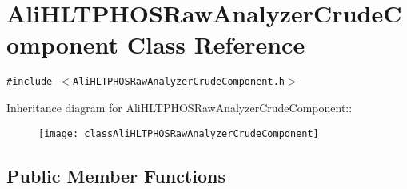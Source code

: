 \section{Ali\-HLTPHOSRaw\-Analyzer\-Crude\-Component Class Reference}
\label{classAliHLTPHOSRawAnalyzerCrudeComponent}
{\tt \#include $<$Ali\-HLTPHOSRaw\-Analyzer\-Crude\-Component.h$>$}

Inheritance diagram for Ali\-HLTPHOSRaw\-Analyzer\-Crude\-Component::\begin{figure}[H]
\begin{center}
\leavevmode
\texttt{[image: classAliHLTPHOSRawAnalyzerCrudeComponent]}
\end{center}
\end{figure}
\subsection*{Public Member Functions}
